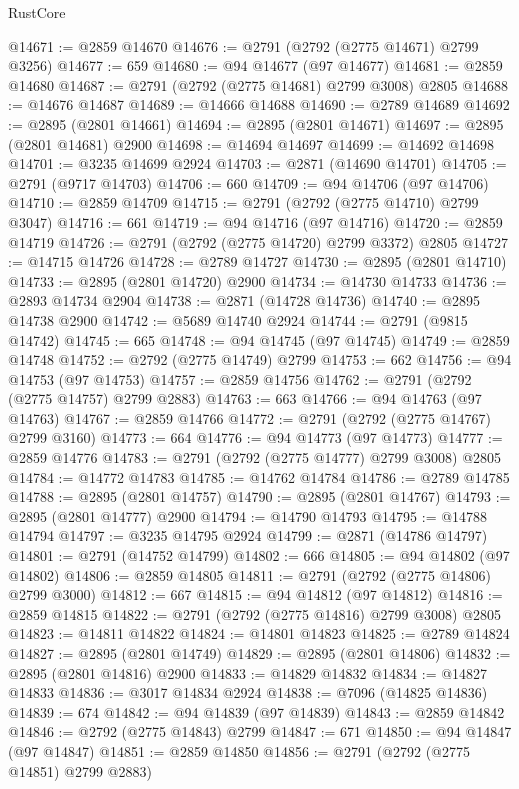 \begin{lexlean}{RustCore}
\begin{coremodule}
@14671 := @2859 @14670
@14676 := @2791 (@2792 (@2775 @14671) @2799 @3256)
@14677 := 659
@14680 := @94 @14677 (@97 @14677)
@14681 := @2859 @14680
@14687 := @2791 (@2792 (@2775 @14681) @2799 @3008) @2805
@14688 := @14676 @14687
@14689 := @14666 @14688
@14690 := @2789 @14689
@14692 := @2895 (@2801 @14661)
@14694 := @2895 (@2801 @14671)
@14697 := @2895 (@2801 @14681) @2900
@14698 := @14694 @14697
@14699 := @14692 @14698
@14701 := @3235 @14699 @2924
@14703 := @2871 (@14690 @14701)
@14705 := @2791 (@9717 @14703)
@14706 := 660
@14709 := @94 @14706 (@97 @14706)
@14710 := @2859 @14709
@14715 := @2791 (@2792 (@2775 @14710) @2799 @3047)
@14716 := 661
@14719 := @94 @14716 (@97 @14716)
@14720 := @2859 @14719
@14726 := @2791 (@2792 (@2775 @14720) @2799 @3372) @2805
@14727 := @14715 @14726
@14728 := @2789 @14727
@14730 := @2895 (@2801 @14710)
@14733 := @2895 (@2801 @14720) @2900
@14734 := @14730 @14733
@14736 := @2893 @14734 @2904
@14738 := @2871 (@14728 @14736)
@14740 := @2895 @14738 @2900
@14742 := @5689 @14740 @2924
@14744 := @2791 (@9815 @14742)
@14745 := 665
@14748 := @94 @14745 (@97 @14745)
@14749 := @2859 @14748
@14752 := @2792 (@2775 @14749) @2799
@14753 := 662
@14756 := @94 @14753 (@97 @14753)
@14757 := @2859 @14756
@14762 := @2791 (@2792 (@2775 @14757) @2799 @2883)
@14763 := 663
@14766 := @94 @14763 (@97 @14763)
@14767 := @2859 @14766
@14772 := @2791 (@2792 (@2775 @14767) @2799 @3160)
@14773 := 664
@14776 := @94 @14773 (@97 @14773)
@14777 := @2859 @14776
@14783 := @2791 (@2792 (@2775 @14777) @2799 @3008) @2805
@14784 := @14772 @14783
@14785 := @14762 @14784
@14786 := @2789 @14785
@14788 := @2895 (@2801 @14757)
@14790 := @2895 (@2801 @14767)
@14793 := @2895 (@2801 @14777) @2900
@14794 := @14790 @14793
@14795 := @14788 @14794
@14797 := @3235 @14795 @2924
@14799 := @2871 (@14786 @14797)
@14801 := @2791 (@14752 @14799)
@14802 := 666
@14805 := @94 @14802 (@97 @14802)
@14806 := @2859 @14805
@14811 := @2791 (@2792 (@2775 @14806) @2799 @3000)
@14812 := 667
@14815 := @94 @14812 (@97 @14812)
@14816 := @2859 @14815
@14822 := @2791 (@2792 (@2775 @14816) @2799 @3008) @2805
@14823 := @14811 @14822
@14824 := @14801 @14823
@14825 := @2789 @14824
@14827 := @2895 (@2801 @14749)
@14829 := @2895 (@2801 @14806)
@14832 := @2895 (@2801 @14816) @2900
@14833 := @14829 @14832
@14834 := @14827 @14833
@14836 := @3017 @14834 @2924
@14838 := @7096 (@14825 @14836)
@14839 := 674
@14842 := @94 @14839 (@97 @14839)
@14843 := @2859 @14842
@14846 := @2792 (@2775 @14843) @2799
@14847 := 671
@14850 := @94 @14847 (@97 @14847)
@14851 := @2859 @14850
@14856 := @2791 (@2792 (@2775 @14851) @2799 @2883)

\end{coremodule}
\end{lexlean}
